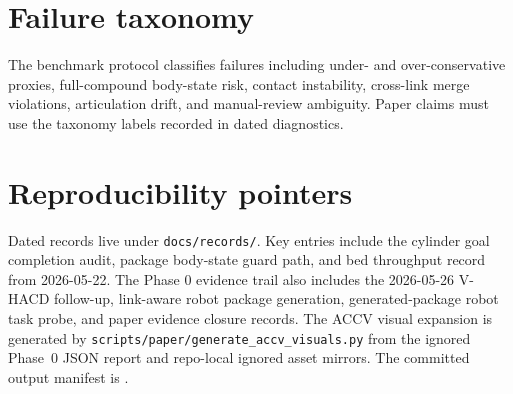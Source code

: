 \appendix
\section{Failure taxonomy}
\label{app:taxonomy}

The benchmark protocol classifies failures including under- and over-conservative proxies, full-compound body-state risk, contact instability, cross-link merge violations, articulation drift, and manual-review ambiguity.
Paper claims must use the taxonomy labels recorded in dated diagnostics.

\section{Reproducibility pointers}
\label{app:repro}

Dated records live under \texttt{docs/records/}.
Key entries include the cylinder goal completion audit, package body-state guard path, and bed throughput record from 2026-05-22.
The Phase 0 evidence trail also includes the 2026-05-26 V-HACD follow-up, link-aware robot package generation, generated-package robot task probe, and paper evidence closure records.
The ACCV visual expansion is generated by
\texttt{scripts/paper/generate\_accv\_visuals.py} from the ignored Phase~0 JSON report and
repo-local ignored asset mirrors.
The committed output manifest is .
